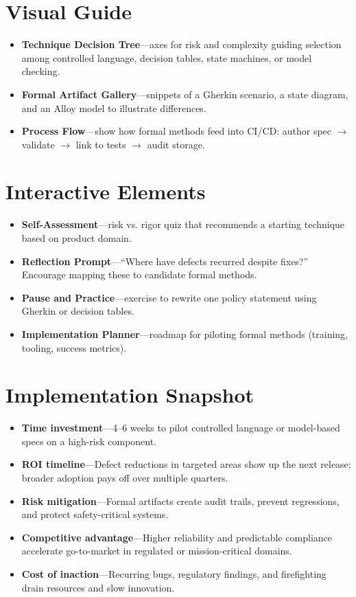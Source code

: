 \section{Visual Guide}
\label{sec:formal-visuals}
\begin{itemize}
    \item \textbf{Technique Decision Tree}—axes for risk and complexity guiding selection among controlled language, decision tables, state machines, or model checking.
    \item \textbf{Formal Artifact Gallery}—snippets of a Gherkin scenario, a state diagram, and an Alloy model to illustrate differences.
    \item \textbf{Process Flow}—show how formal methods feed into CI/CD: author spec $\rightarrow$ validate $\rightarrow$ link to tests $\rightarrow$ audit storage.
\end{itemize}

\section{Interactive Elements}
\label{sec:formal-interactive}
\begin{itemize}
    \item \textbf{Self-Assessment}—risk vs. rigor quiz that recommends a starting technique based on product domain.
    \item \textbf{Reflection Prompt}—``Where have defects recurred despite fixes?'' Encourage mapping these to candidate formal methods.
    \item \textbf{Pause and Practice}—exercise to rewrite one policy statement using Gherkin or decision tables.
    \item \textbf{Implementation Planner}—roadmap for piloting formal methods (training, tooling, success metrics).
\end{itemize}

\section{Implementation Snapshot}
\label{sec:formal-snapshot}
\begin{itemize}
    \item \textbf{Time investment}—4--6 weeks to pilot controlled language or model-based specs on a high-risk component.
    \item \textbf{ROI timeline}—Defect reductions in targeted areas show up the next release; broader adoption pays off over multiple quarters.
    \item \textbf{Risk mitigation}—Formal artifacts create audit trails, prevent regressions, and protect safety-critical systems.
    \item \textbf{Competitive advantage}—Higher reliability and predictable compliance accelerate go-to-market in regulated or mission-critical domains.
    \item \textbf{Cost of inaction}—Recurring bugs, regulatory findings, and firefighting drain resources and slow innovation.
\end{itemize}
